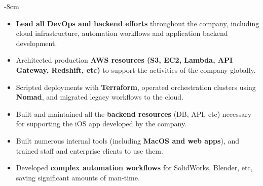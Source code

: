 \documentclass[10pt,a4paper]{altacv}
\begin{document}


\begin{adjustwidth}{}{-8cm}
\makecvheader
\end{adjustwidth}


\begin{itemize}
	\item \textbf{Lead all DevOps and backend efforts} throughout the company, including cloud infrastructure, automation workflows and application backend development.
	\item Architected production \textbf{AWS resources (S3, EC2, Lambda, API Gateway, Redshift, etc)} to support the activities of the company globally.
	\item Scripted deployments with \textbf{Terraform}, operated orchestration clusters using \textbf{Nomad}, and migrated legacy workflows to the cloud.
	\item Built and maintained all the \textbf{backend resources} (DB, API, etc) necessary for supporting the iOS app developed by the company.
	\item Built numerous internal tools (including \textbf{MacOS and web apps}), and trained staff and enterprise clients to use them.
	\item Developed \textbf{complex automation workflows} for SolidWorks, Blender, etc, saving significant amounts of man-time.
\end{itemize}

\divider
\end{document}
